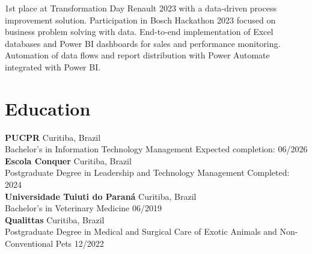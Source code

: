 \documentclass[11pt,a4paper]{article}
\begin{document}
1st place at Transformation Day Renault 2023 with a data-driven process improvement solution. Participation in Bosch Hackathon 2023 focused on business problem solving with data. End-to-end implementation of Excel databases and Power BI dashboards for sales and performance monitoring. Automation of data flows and report distribution with Power Automate integrated with Power BI.

\section{Education}

\textbf{PUCPR} \hfill Curitiba, Brazil\\
Bachelor's in Information Technology Management \hfill Expected completion: 06/2026\\[6pt]

\textbf{Escola Conquer} \hfill Curitiba, Brazil\\
Postgraduate Degree in Leadership and Technology Management \hfill Completed: 2024\\[6pt]

\textbf{Universidade Tuiuti do Paraná} \hfill Curitiba, Brazil\\
Bachelor's in Veterinary Medicine \hfill 06/2019\\[6pt]

\textbf{Qualittas} \hfill Curitiba, Brazil\\
Postgraduate Degree in Medical and Surgical Care of Exotic Animals and Non-Conventional Pets \hfill 12/2022
\end{document}
